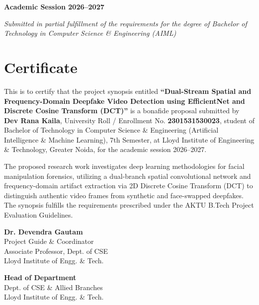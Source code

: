 \documentclass[12pt,a4paper]{report}
\begin{document}
\begin{titlepage}
    {\large \textbf{Academic Session 2026--2027}\par}
    \vspace{0.2cm}
    {\small \textit{Submitted in partial fulfillment of the requirements for the degree of Bachelor of Technology in Computer Science \& Engineering (AIML)}\par}
\end{titlepage}


\chapter*{Certificate}
\thispagestyle{plain}

This is to certify that the project synopsis entitled \textbf{“Dual-Stream Spatial and Frequency-Domain Deepfake Video Detection using EfficientNet and Discrete Cosine Transform (DCT)”} is a bonafide proposal submitted by \textbf{Dev Rana Kaila}, University Roll / Enrollment No. \textbf{2301531530023}, student of Bachelor of Technology in Computer Science \& Engineering (Artificial Intelligence \& Machine Learning), 7th Semester, at Lloyd Institute of Engineering \& Technology, Greater Noida, for the academic session 2026--2027.

\vspace{0.5cm}
The proposed research work investigates deep learning methodologies for facial manipulation forensics, utilizing a dual-branch spatial convolutional network and frequency-domain artifact extraction via 2D Discrete Cosine Transform (DCT) to distinguish authentic video frames from synthetic and face-swapped deepfakes. The synopsis fulfills the requirements prescribed under the AKTU B.Tech Project Evaluation Guidelines.

\vspace{5.0cm}
\noindent
\begin{minipage}[t]{0.5\textwidth}
    \textbf{Dr. Devendra Gautam}\\
    Project Guide \& Coordinator\\
    Associate Professor, Dept. of CSE\\
    Lloyd Institute of Engg. \& Tech.
\end{minipage}
\hfill
\begin{minipage}[t]{0.45\textwidth}
    \raggedleft
    \textbf{Head of Department}\\
    Dept. of CSE \& Allied Branches\\
    Lloyd Institute of Engg. \& Tech.
\end{minipage}
\end{document}
